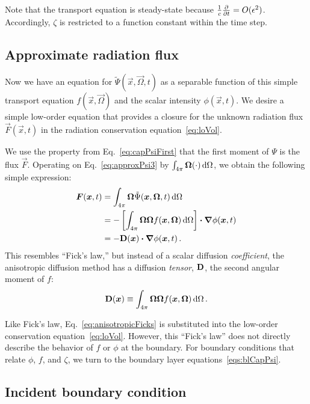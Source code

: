 Note that the transport equation is steady-state because $\frac{1}{c}\frac{\partial }{\partial t}=
O(\epsilon^2)$. Accordingly, $\zeta$ is restricted to a function constant within
the time step.

\subsection{Approximate radiation flux}
Now we have an equation for $\tilde\Psi(\vec{x}, \vec{\Omega}, t)$ as a
separable
function of this simple transport equation $f(\vec{x}, \vec{\Omega})$ and the
scalar intensity $\phi(\vec{x},t)$.
We desire a simple low-order equation that provides a closure for the unknown
radiation flux $\vec{F}(\vec{x},t)$ in the radiation conservation
equation~\eqref{eq:loVol}.

We use the property from Eq.~\eqref{eq:capPsiFirst}
that the first moment of $\Psi$ is the flux $\vec{F}$. Operating on 
Eq.~\eqref{eq:approxPsi3} by $\int_{4\pi} \bm{\Omega} (\cdot) \mathop{}\!\mathrm{d}\Omega$, we
obtain the following simple expression:
\begin{align} \nonumber
  \bm{F}(\bm{x}, t)
  &= \int_{4\pi} \bm{\Omega} \tilde \Psi(\bm{x}, \bm{\Omega}, t) \mathop{}\!\mathrm{d}\Omega
  \\ \nonumber
  &= 
  - \left[ \int_{4\pi} \bm{\Omega} \bm{\Omega} f(\bm{x}, \bm{\Omega})
  \mathop{}\!\mathrm{d}\Omega \right]
  \bm{\cdot} \bm{\nabla} \phi(\bm{x},t)
  \\ \label{eq:anisotropicFicks}
  &= - \mathbf{D}(\bm{x}) \bm{\cdot} \bm{\nabla} \phi(\bm{x},t) \,.
\end{align}
This resembles ``Fick's law,'' but instead of a scalar diffusion
\emph{coefficient},
the anisotropic diffusion method has a diffusion \emph{tensor}, $\mathbf{D}$, the
second angular moment of $f$:
\begin{equation}\label{eq:dDefinition}
  \mathbf{D}(\bm{x}) \equiv \int_{4\pi} \bm{\Omega} \bm{\Omega}
  f(\bm{x}, \bm{\Omega}) \mathop{}\!\mathrm{d}\Omega \,.
\end{equation}

Like Fick's law, Eq.~\eqref{eq:anisotropicFicks} is substituted into
the low-order conservation equation~\eqref{eq:loVol}.
However, this ``Fick's law'' does not directly describe the behavior of $f$ or
$\phi$ at the boundary. For boundary conditions that relate $\phi$, $f$, and
$\zeta$, we turn to the boundary layer equations~\eqref{eqs:blCapPsi}.

\subsection{Incident boundary condition}\label{sec:zeta}

